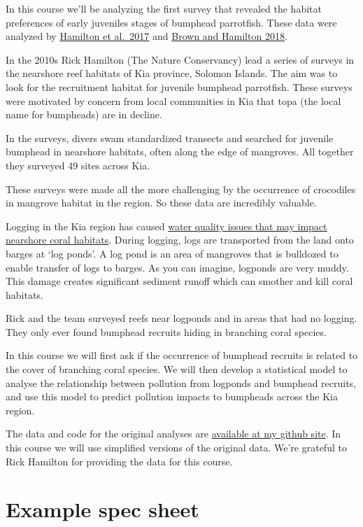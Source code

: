 \documentclass[
  letterpaper,
  DIV=11,
  numbers=noendperiod]{scrreprt}
\begin{document}
In this course we'll be analyzing the first survey that revealed the
habitat preferences of early juveniles stages of bumphead parrotfish.
These data were analyzed by
\href{http://dx.doi.org/10.1016/j.biocon.2017.04.024}{Hamilton et
al.~2017} and \href{http://dx.doi.org/10.1111/cobi.13079}{Brown and
Hamilton 2018}.

In the 2010s Rick Hamilton (The Nature Conservancy) lead a series of
surveys in the nearshore reef habitats of Kia province, Solomon Islands.
The aim was to look for the recruitment habitat for juvenile bumphead
parrotfish. These surveys were motivated by concern from local
communities in Kia that topa (the local name for bumpheads) are in
decline.

In the surveys, divers swam standardized transects and searched for
juvenile bumphead in nearshore habitats, often along the edge of
mangroves. All together they surveyed 49 sites across Kia.

These surveys were made all the more challenging by the occurrence of
crocodiles in mangrove habitat in the region. So these data are
incredibly valuable.

Logging in the Kia region has caused
\href{http://dx.doi.org/10.1111/cobi.13079}{water quality issues that
may impact nearshore coral habitats}. During logging, logs are
transported from the land onto barges at `log ponds'. A log pond is an
area of mangroves that is bulldozed to enable transfer of logs to
barges. As you can imagine, logponds are very muddy. This damage creates
significant sediment runoff which can smother and kill coral habitats.

Rick and the team surveyed reefs near logponds and in areas that had no
logging. They only ever found bumphead recruits hiding in branching
coral species.

In this course we will first ask if the occurrence of bumphead recruits
is related to the cover of branching coral species. We will then develop
a statistical model to analyse the relationship between pollution from
logponds and bumphead recruits, and use this model to predict pollution
impacts to bumpheads across the Kia region.

The data and code for the original analyses are
\href{https://github.com/cbrown5/BenthicLatent}{available at my github
site}. In this course we will use simplified versions of the original
data. We're grateful to Rick Hamilton for providing the data for this
course.

\section{Example spec sheet}\label{example-spec-sheet}
\end{document}
